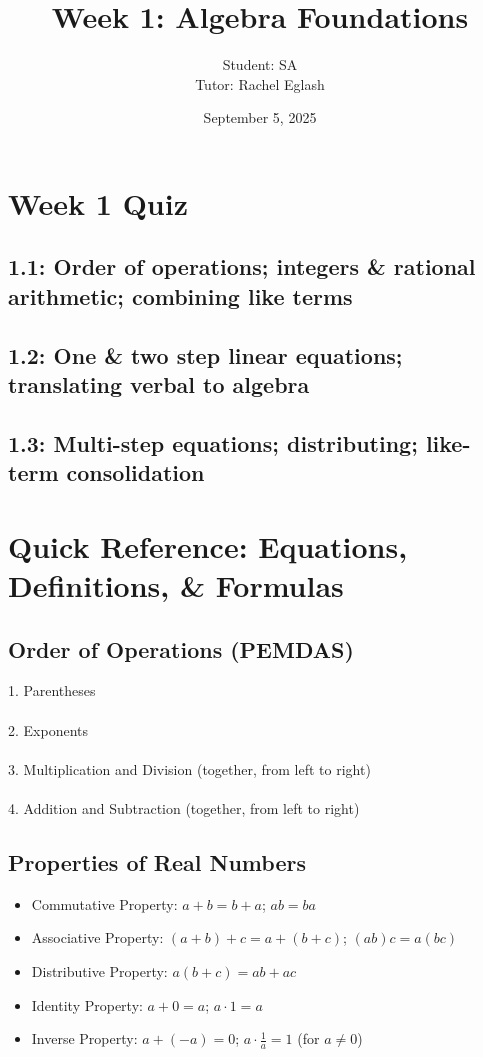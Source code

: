 \documentclass[12pt]{article}
\title{Week 1: Algebra Foundations}
\author{
	Student: SA\\
	Tutor: Rachel Eglash}
\date{September 5, 2025}
\begin{document}
	
	\maketitle

	\section*{Week 1 Quiz}
        
        \subsection*{1.1: Order of operations; integers \& rational arithmetic; combining like terms}

	    \subsection*{1.2: One \& two step linear equations; translating verbal to algebra}
        
        \subsection*{1.3: Multi-step equations; distributing; like-term consolidation}
	    
            \newpage
	
	\section*{Quick Reference: Equations, Definitions, \& Formulas}
	
        \subsection*{Order of Operations (PEMDAS)}
            1. Parentheses\\\\
            2. Exponents\\\\
            3. Multiplication and Division (together, from left to right)\\\\
            4. Addition and Subtraction (together, from left to right)

	    \subsection*{Properties of Real Numbers}
        	\begin{itemize}
            	\item Commutative Property: $a + b = b + a$; \quad $ab = ba$
                \item Associative Property: $(a + b) + c = a + (b + c)$; \quad $(ab)c = a(bc)$
                \item Distributive Property: $a(b + c) = ab + ac$
                \item Identity Property: $a + 0 = a$; \quad $a \cdot 1 = a$
                \item Inverse Property: $a + (-a) = 0$; \quad $a \cdot \frac{1}{a} = 1$ (for $a \neq 0$)
            \end{itemize}
	
\end{document}
